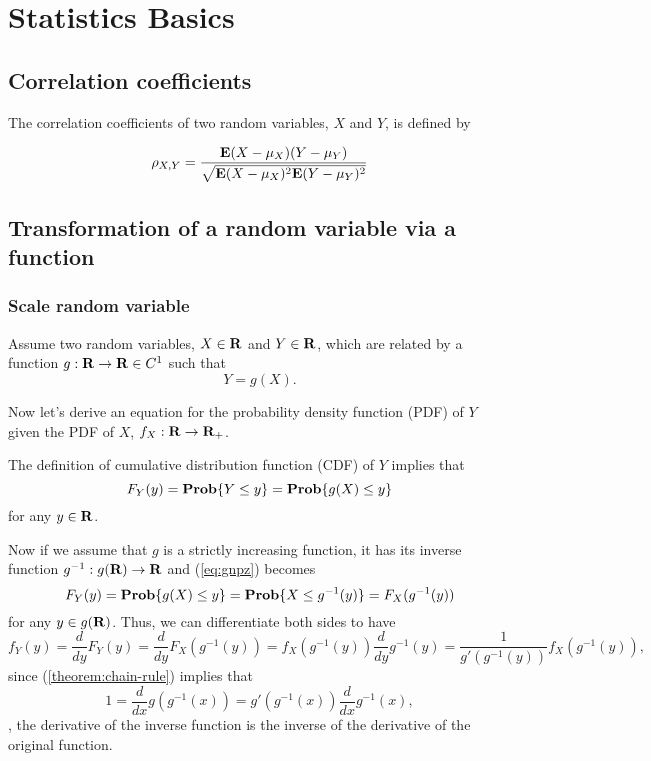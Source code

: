 

\chapter{Statistics Basics}

\section{Correlation coefficients}

The correlation coefficients of two random variables, $X$ and $Y$, is defined by

\begin{equation}
\rho_{X,Y} = \frac{{\bf E{}} (X-\mu_X)(Y-\mu_Y)} {\sqrt{{\bf E{}} (X-\mu_X)^2 {\bf E{}}(Y-\mu_Y)^2}}
\end{equation}


\section{Transformation of a random variable via a function}

\subsection{Scale random variable}

Assume two random variables, $X\in\mathbf{R}$ and $Y\in\mathbf{R}$, which are related by
a function $g:\mathbf{R} \to \mathbf{R} \in C^{1}$
such that
\begin{equation}
\label{eq:g8cx}
Y = g(X).
\end{equation}

Now let's derive an equation for the probability density function (PDF) of $Y$
given the PDF of $X$, $f_X:\mathbf{R}\to{\mathbf{R}_+}$.

The definition of cumulative distribution function (CDF) of $Y$ implies that
\begin{equation}
\label{eq:gnpz}
    F_Y(y) = \mathop{\bf Prob}\{Y \leq y\} = \mathop{\bf Prob}\{g(X) \leq y\}
\end{equation}
for any $y\in\mathbf{R}$.

Now if we assume that $g$ is a strictly increasing function, it has its inverse function $g^{-1}: g(\mathbf{R}) \to \mathbf{R}$
and
(\ref{eq:gnpz}) becomes
\[
    F_Y(y) = \mathop{\bf Prob}\{g(X) \leq y\}
    = \mathop{\bf Prob}\{X \leq g^{-1}(y)\}
    = F_X(g^{-1}(y))
\]
for any $y\in g(\mathbf{R})$.
Thus, we can differentiate both sides to have
\begin{equation}
\label{eq:gnpz-1}
    f_Y(y) = \frac{d}{dy} F_Y(y)
    = \frac{d}{dy} F_X(g^{-1}(y))
    = f_X(g^{-1}(y)) \frac{d}{dy} g^{-1}(y)
    = \frac{1}{g'(g^{-1}(y))} f_X(g^{-1}(y)),
\end{equation}
since (\ref{theorem:chain-rule}) implies that
\begin{equation}
1
= \frac{d}{dx} g(g^{-1}(x))
= g'(g^{-1}(x)) \frac{d}{dx} g^{-1}(x),
\end{equation}
\ie, the derivative of the inverse function
is the inverse of the derivative of the original function.

